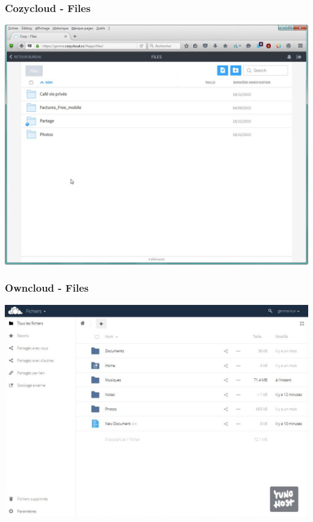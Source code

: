 \documentclass{beamer}
\begin{document}
\begin{frame}
\frametitle{Cozycloud - Files}
\includegraphics[scale=0.35] {./CozyCloud/CozyCloud_Files.jpg}
\end{frame}

\begin{frame}
\frametitle{Owncloud - Files}
\includegraphics[scale=0.3] {./Owncloud/Owncloud_Fichiers.jpg}
\end{frame}
\end{document}
